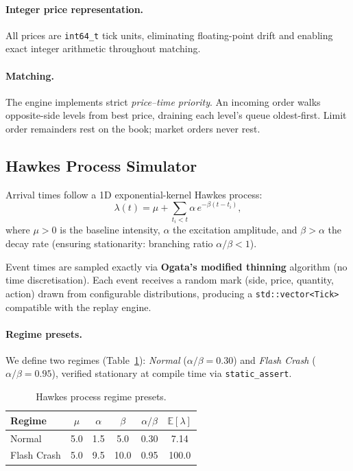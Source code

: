 \documentclass[11pt,twocolumn]{article}
\newcommand{\E}{\mathbb{E}}
\begin{document}
\paragraph{Integer price representation.}
All prices are \texttt{int64\_t} tick units, eliminating floating-point
drift and enabling exact integer arithmetic throughout matching.

\paragraph{Matching.}
The engine implements strict \emph{price--time priority}.
An incoming order walks opposite-side levels from best price,
draining each level's queue oldest-first.
Limit order remainders rest on the book; market orders never rest.

\subsection{Hawkes Process Simulator}\label{sec:hawkes}

Arrival times follow a 1D exponential-kernel Hawkes process:
\begin{equation}\label{eq:hawkes}
  \lambda(t) = \mu + \sum_{t_i < t} \alpha\, e^{-\beta(t - t_i)},
\end{equation}
where $\mu > 0$ is the baseline intensity, $\alpha$ the excitation
amplitude, and $\beta > \alpha$ the decay rate (ensuring stationarity:
branching ratio $\alpha/\beta < 1$).

Event times are sampled exactly via \textbf{Ogata's modified thinning}
algorithm (no time discretisation).  Each event receives a random mark
(side, price, quantity, action) drawn from configurable distributions,
producing a \texttt{std::vector<Tick>} compatible with the replay engine.

\paragraph{Regime presets.}
We define two regimes (Table~\ref{tab:regimes}):
\emph{Normal} ($\alpha/\beta = 0.30$) and
\emph{Flash Crash} ($\alpha/\beta = 0.95$), verified stationary at
compile time via \texttt{static\_assert}.

\begin{table}[t]
\centering
\caption{Hawkes process regime presets.}
\label{tab:regimes}
\small
\begin{tabular}{@{}lccccc@{}}
\toprule
Regime & $\mu$ & $\alpha$ & $\beta$ & $\alpha/\beta$ & $\E[\lambda]$ \\
\midrule
Normal      & 5.0 & 1.5 & 5.0  & 0.30 & 7.14 \\
Flash Crash & 5.0 & 9.5 & 10.0 & 0.95 & 100.0 \\
\bottomrule
\end{tabular}
\end{table}
\end{document}
